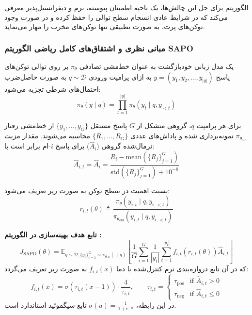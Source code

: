 الگوریتم  برای حل این چالش‌ها، یک ناحیه اطمینان پیوسته، نرم و دیفرانسیل‌پذیر معرفی می‌کند که در شرایط عادی انسجام سطح توالی را حفظ کرده و در صورت وجود توکن‌های پرت، به صورت تطبیقی تنها توکن‌های مخرب را مهار می‌نماید.

\subsubsection*{مبانی نظری و اشتقاق‌های کامل ریاضی الگوریتم SAPO}

یک مدل زبانی خودبازگشت به عنوان خط‌مشی تصادفی $\pi_\theta$ بر روی توالی توکن‌های پاسخ $y = (y_1, y_2, \dots, y_{|y|})$ به ازای پرامپت ورودی $q \sim \mathcal{D}$ به صورت حاصل‌ضرب احتمال‌های شرطی تجزیه می‌شود:
\begin{equation}
	\label{eq:autoregressive_policy}
	\pi_\theta(y \mid q) = \prod_{t=1}^{|y|} \pi_\theta(y_t \mid q, y_{<t})
\end{equation}

برای هر پرامپت $q$، گروهی متشکل از $G$ پاسخ مستقل $\{y_1, \dots, y_G\}$ از خط‌مشی رفتار $\pi_{\theta_{\text{old}}}$ نمونه‌برداری شده و پاداش‌های عددی $\{R_1, \dots, R_G\}$ محاسبه می‌شوند. مقدار مزیت نرمال‌شده گروهی ($\hat{A}_i$) برای پاسخ $i$-ام برابر است با:
\begin{equation}
	\label{eq:group_advantage}
	\hat{A}_{i,t} = \hat{A}_i = \frac{R_i - \text{mean}\left(\{R_j\}_{j=1}^G\right)}{\text{std}\left(\{R_j\}_{j=1}^G\right) + 10^{-8}}
\end{equation}

نسبت اهمیت در سطح توکن به صورت زیر تعریف می‌شود:
\begin{equation}
	\label{eq:token_ratio}
	r_{i,t}(\theta) \triangleq \frac{\pi_\theta(y_{i,t} \mid q, y_{i,<t})}{\pi_{\theta_{\text{old}}}(y_{i,t} \mid q, y_{i,<t})}
\end{equation}

\textbf{تابع هدف بهینه‌سازی در الگوریتم :}
\begin{equation}
	\label{eq:sapo_objective}
	J_{\text{SAPO}}(\theta) = \mathbb{E}_{q \sim \mathcal{D}, \{y_i\}_{i=1}^G \sim \pi_{\theta_{\text{old}}}(\cdot \mid q)} \left[ \frac{1}{G} \sum_{i=1}^G \frac{1}{|y_i|} \sum_{t=1}^{|y_i|} f_{i,t}\left(r_{i,t}(\theta)\right) \hat{A}_{i,t} \right]
\end{equation}
که در آن تابع دروازه‌بندی نرم کنترل‌شده با دما $f_{i,t}(x)$ به صورت زیر تعریف می‌گردد:
\begin{equation}
	\label{eq:soft_gating_func}
	f_{i,t}(x) = \sigma\left(\tau_{i,t} (x - 1)\right) \cdot \frac{4}{\tau_{i,t}}, \qquad \tau_{i,t} = \begin{cases} \tau_{\text{pos}} & \text{if } \hat{A}_{i,t} > 0 \\ \tau_{\text{neg}} & \text{if } \hat{A}_{i,t} \le 0 \end{cases}
\end{equation}
در این رابطه، $\sigma(u) = \frac{1}{1 + e^{-u}}$ تابع سیگموئید استاندارد است.

